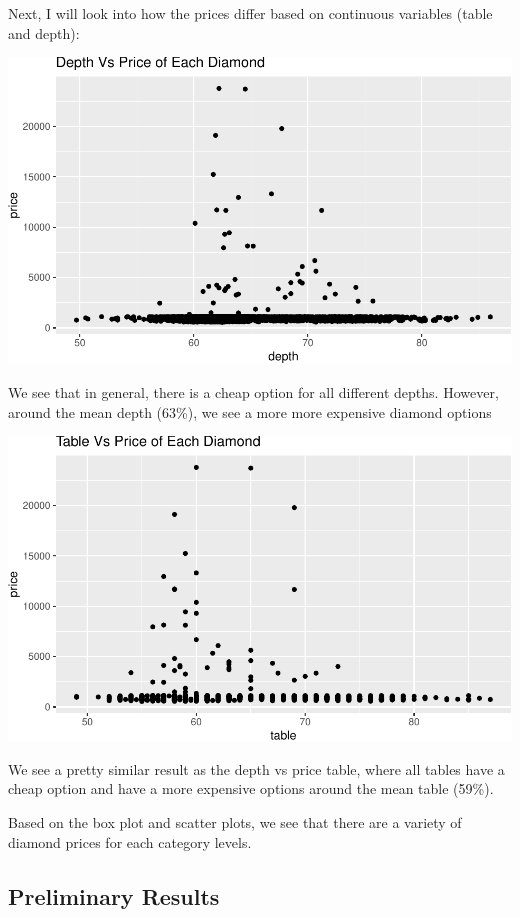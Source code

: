 \documentclass[
]{article}
\begin{document}
Next, I will look into how the prices differ based on continuous
variables (table and depth):

\begin{center}\includegraphics[width=0.8\linewidth]{Methods_and_Results_files/figure-latex/unnamed-chunk-12-1} \end{center}

We see that in general, there is a cheap option for all different
depths. However, around the mean depth (63\%), we see a more more
expensive diamond options

\begin{center}\includegraphics[width=0.8\linewidth]{Methods_and_Results_files/figure-latex/unnamed-chunk-13-1} \end{center}

We see a pretty similar result as the depth vs price table, where all
tables have a cheap option and have a more expensive options around the
mean table (59\%).

Based on the box plot and scatter plots, we see that there are a variety
of diamond prices for each category levels.

\hypertarget{preliminary-results}{%
\subsection{Preliminary Results}\label{preliminary-results}}
\end{document}
